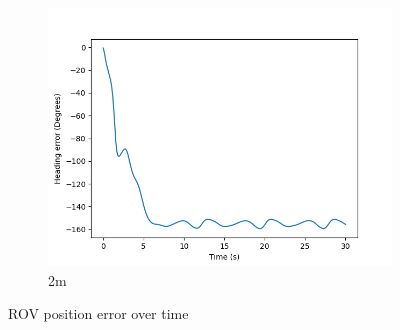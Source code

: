 \documentclass[class=article, crop=false]{standalone}
\begin{document}
\begin{figure}
\begin{subfigure}[b]{0.48\textwidth}
        \centering
        \includegraphics{scenario1/rov-0m/2.0m/usv_heading_error_uncontrolled}
        \caption{2m}
        \label{}
    \end{subfigure}

    \caption{ROV position error over time}
\end{figure}
\end{document}

